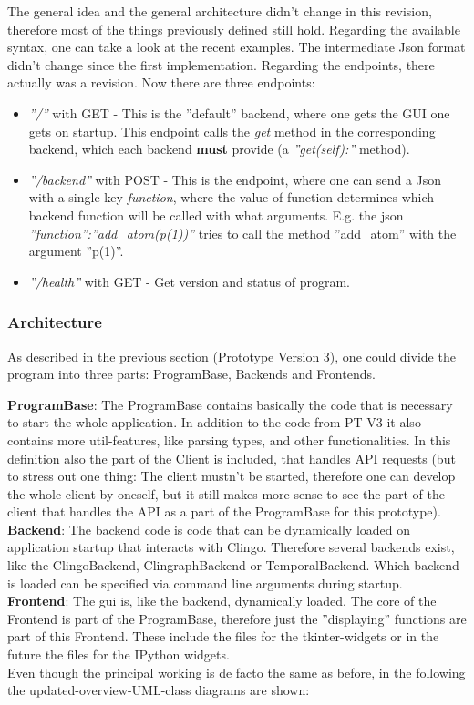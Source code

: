 \documentclass[12pt,a4paper]{article}
\newcommand{\<}[1]{\guilsinglleft}
\renewcommand{\>}[1]{\guilsinglright}
\begin{document}
\noindent
The general idea and the general architecture didn't change in this revision, therefore most of the things previously defined still hold. Regarding the available syntax, one can take a look at the recent examples. The intermediate Json format didn't change since the first implementation. Regarding the endpoints, there actually was a revision. Now there are three endpoints:
\begin{itemize}
    \item \textit{''/''} with GET - This is the ''default'' backend, where one gets the GUI one gets on startup. This endpoint calls the \textit{get} method in the corresponding backend, which each backend \textbf{must} provide (a \textit{''get(self):''} method).
    \item \textit{''/backend''} with POST - This is the endpoint, where one can send a Json with a single key \textit{function}, where the value of function determines which backend function will be called with what arguments. E.g. the json \textit{''function'':''add_atom(p(1))''} tries to call the method ''add_atom'' with the argument ''p(1)''.
    \item \textit{''/health''} with GET - Get version and status of program.
\end{itemize}

\subsubsection{Architecture}

\noindent As described in the previous section (Prototype Version 3), one could divide the program into three parts: ProgramBase, Backends and Frontends.

\textbf{ProgramBase}: The ProgramBase contains basically the code that is necessary to start the whole application. In addition to the code from PT-V3 it also contains more util-features, like parsing types, and other functionalities. In this definition also the part of the Client is included, that handles API requests (but to stress out one thing: The client mustn't be started, therefore one can develop the whole client by oneself, but it still makes more sense to see the part of the client that handles the API as a part of the ProgramBase for this prototype).\\[1em]
\textbf{Backend}: The backend code is code that can be dynamically loaded on application startup that interacts with Clingo. Therefore several backends exist, like the ClingoBackend, ClingraphBackend or TemporalBackend. Which backend is loaded can be specified via command line arguments during startup.\\[1em]
\textbf{Frontend}: The gui is, like the backend, dynamically loaded. The core of the Frontend is part of the ProgramBase, therefore just the ''displaying'' functions are part of this Frontend. These include the files for the tkinter-widgets or in the future the files for the IPython widgets.\\[1em]
Even though the principal working is de facto the same as before, in the following the updated-overview-UML-class diagrams are shown:
\end{document}
